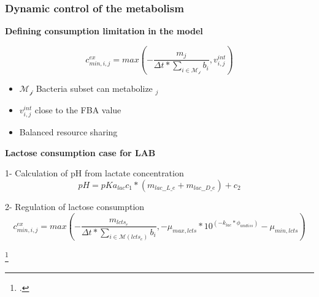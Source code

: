 \documentclass[8pt,usenames,dvipsnames]{beamer}
\begin{document}
\begin{frame}
\frametitle{Dynamic control of the metabolism}

\textbf{Defining consumption limitation in the model}

\begin{equation}
c^{ex}_{min,i,j} = max(-\frac{m_{j}}{\Delta t*\sum_{i \in \mathcal{M_j}} b_i}, v^{int}_{i,j})
\end{equation}


\begin{itemize}
\item $\mathcal{M_j}$ Bacteria subset can metabolize $_j$
\item $v^{int}_{i,j}$ close to the FBA value
\item Balanced resource sharing \\
\end{itemize}
\vspace{1cm}
\textbf{Lactose consumption case for LAB}

1- Calculation of pH  from lactate concentration\\

\[
pH = pKa_{lac} c_1 * (m_{lac\_\_L\_e}+m_{lac\_\_D\_e})+c_2
\]


2- Regulation of lactose consumption \\
\begin{equation}
c^{ex}_{min,i,j} = max(-\frac{m_{lcts_e}}{\Delta t*\sum_{i \in \mathcal{M}(lcts_e)} b_i},-\mu_{max,lcts}*10^{(-k_{lac}*\phi_{undiss})}-\mu_{min,lcts})
\end{equation}

\footcite{Ozcan.2020}

\end{frame}
\end{document}
